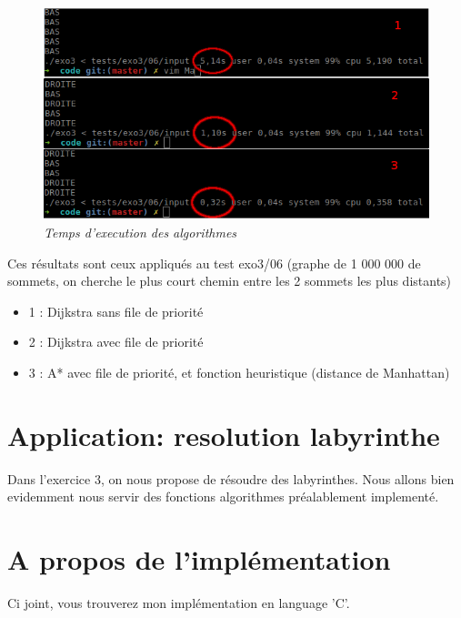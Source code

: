 \documentclass[a4paper,10pt]{article}
\begin{document}
    \begin{figure}
      \begin{center}
	\includegraphics[width=12cm,height=\textheight,keepaspectratio]{./images/performances.png}
      \end{center}
      \caption{\textit{Temps d'execution des algorithmes}}
    \end{figure}
    Ces résultats sont ceux appliqués au test exo3/06\newline
    (graphe de 1 000 000 de sommets, on cherche le plus court chemin entre les 2 sommets les plus distants)
    \begin{itemize}[label=-]
      \item 1 : Dijkstra sans file de priorité
      \item 2 : Dijkstra avec file de priorité
      \item 3 : A* avec file de priorité, et fonction heuristique (distance de Manhattan)
    \end{itemize}
    
  \newpage
  \section{Application: resolution labyrinthe}
    Dans l'exercice 3, on nous propose de résoudre des labyrinthes. Nous allons bien evidemment nous servir des fonctions algorithmes
    préalablement implementé.
  \newpage
  \section{A propos de l'implémentation}
    Ci joint, vous trouverez mon implémentation en language 'C'.
\end{document}
